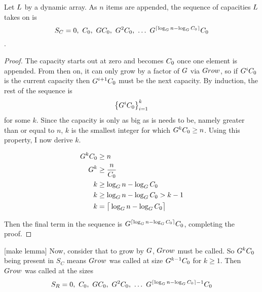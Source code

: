 \begin{lemma}
\label{CapacitySequence}
	Let $L$ by a dynamic array. As $n$ items are appended, the sequence of capacities $L$ takes on is $$S_C = 0,\ \InitCapacity,\ \GrowthFactor\InitCapacity,\ \GrowthFactor^2\InitCapacity,\ \ldots\ \GrowthFactor^{\lceil \log_{\GrowthFactor} n - \log_{\GrowthFactor} \InitCapacity \rceil}\InitCapacity$$.
\end{lemma}

\begin{proof}
	The capacity starts out at zero and becomes $C_0$ once one element is appended. From then on, it can only grow by a factor of $G$ via $Grow$, so if $G^iC_0$ is the current capacity then $G^{i + 1}C_0$ must be the next capacity. By induction, the rest of the sequence is $$\left\{ G^iC_0 \right\}_{i = 1}^k$$ for some $k$. Since the capacity is only as big as is needs to be, namely greater than or equal to $n$, $k$ is the smallest integer for which $G^kC_0 \geq n$. Using this property, I now derive $k$.
	
	\begin{align*}
	G^kC_0 &\geq n\\
	G^k &\geq \frac{n}{C_0}\\
	k &\geq \log_{G} n - \log_{G} C_0\\
	k &\geq \log_{G} n - \log_{G} C_0 > k - 1\\
	k &= \big\lceil \log_{G} n - \log_{G} C_0 \big\rceil
	\end{align*}
	
	Then the final term in the sequence is $G^{\lceil \log_{G} n - \log_{G} C_0 \rceil}C_0$, completing the proof.
\end{proof}

[make lemma]
Now, consider that to grow by $G$, $Grow$ must be called. So $G^kC_0$ being present in $S_C$ means $Grow$ was called at size $G^{k - 1}C_0$ for $k \geq 1$. Then $Grow$ was called at the sizes $$S_R = 0,\ \InitCapacity,\ \GrowthFactor\InitCapacity,\ \GrowthFactor^2\InitCapacity,\ \ldots\ \GrowthFactor^{\lceil \log_{\GrowthFactor} n - \log_{\GrowthFactor} \InitCapacity \rceil - 1}\InitCapacity$$

